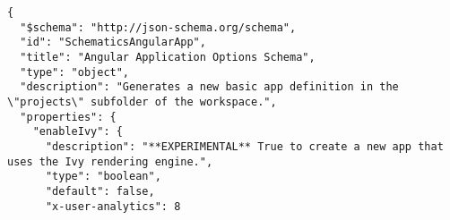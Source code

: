 \begin{verbatim}
{
  "$schema": "http://json-schema.org/schema",
  "id": "SchematicsAngularApp",
  "title": "Angular Application Options Schema",
  "type": "object",
  "description": "Generates a new basic app definition in the \"projects\" subfolder of the workspace.",
  "properties": {
    "enableIvy": {
      "description": "**EXPERIMENTAL** True to create a new app that uses the Ivy rendering engine.",
      "type": "boolean",
      "default": false,
      "x-user-analytics": 8
\end{verbatim}

